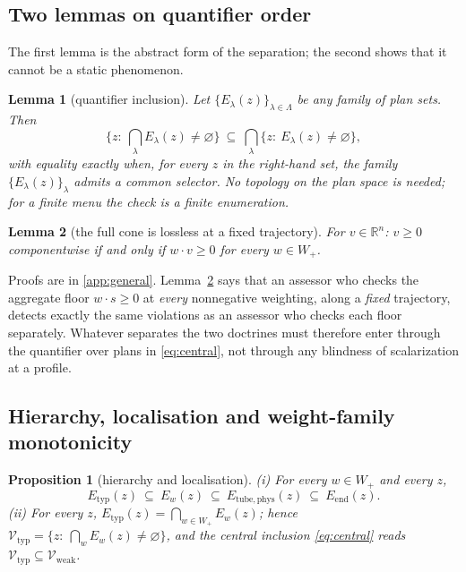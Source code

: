 \documentclass[preprint,11pt,authoryear]{elsarticle}
\newtheorem{proposition}{Proposition}
\newtheorem{lemma}{Lemma}
\theoremstyle{definition}
\theoremstyle{remark}
\newcommand{\Etyp}{E_{\mathrm{typ}}}
\newcommand{\Eend}{E_{\mathrm{end}}}
\newcommand{\Ephys}{E_{\mathrm{tube,phys}}}
\newcommand{\Vtyp}{\mathcal{V}_{\mathrm{typ}}}
\newcommand{\Vweak}{\mathcal{V}_{\mathrm{weak}}}
\newcommand{\Wp}{W_+}
\begin{document}
\subsection{Two lemmas on quantifier order}

The first lemma is the abstract form of the separation; the second shows that it cannot be a static phenomenon.

\begin{lemma}[quantifier inclusion]\label{lem:quant}
Let $\{E_\lambda(z)\}_{\lambda\in\Lambda}$ be any family of plan sets. Then
\[
\Big\{z:\ \textstyle\bigcap_\lambda E_\lambda(z)\neq\varnothing\Big\}\ \subseteq\ \bigcap_\lambda\big\{z:\ E_\lambda(z)\neq\varnothing\big\},
\]
with equality exactly when, for every $z$ in the right-hand set, the family $\{E_\lambda(z)\}_\lambda$ admits a common selector. No topology on the plan space is needed; for a finite menu the check is a finite enumeration.
\end{lemma}

\begin{lemma}[the full cone is lossless at a fixed trajectory]\label{lem:cone}
For $v\in\mathbb R^n$: $v\ge0$ componentwise if and only if $w\cdot v\ge0$ for every $w\in\Wp$.
\end{lemma}

Proofs are in \ref{app:general}. Lemma~\ref{lem:cone} says that an assessor who checks the aggregate floor $w\cdot s\ge0$ at \emph{every} nonnegative weighting, along a \emph{fixed} trajectory, detects exactly the same violations as an assessor who checks each floor separately. Whatever separates the two doctrines must therefore enter through the quantifier over plans in \eqref{eq:central}, not through any blindness of scalarization at a profile.

\subsection{Hierarchy, localisation and weight-family monotonicity}

\begin{proposition}[hierarchy and localisation]\label{prop:hierarchy}
\textup{(i)} For every $w\in\Wp$ and every $z$,
\[
\Etyp(z)\ \subseteq\ E_w(z)\ \subseteq\ \Ephys(z)\ \subseteq\ \Eend(z).
\]
\textup{(ii)} For every $z$, $\Etyp(z)=\bigcap_{w\in\Wp}E_w(z)$; hence $\Vtyp=\{z:\ \bigcap_wE_w(z)\neq\varnothing\}$, and the central inclusion \eqref{eq:central} reads $\Vtyp\subseteq\Vweak$.
\end{proposition}
\end{document}
